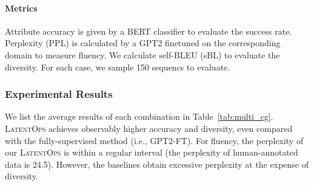 \documentclass[11pt]{article}
\begin{document}
\paragraph{Metrics}
Attribute accuracy is given by a BERT classifier to evaluate the success rate.
Perplexity (PPL) is calculated by a GPT2 finetuned on the corresponding domain to measure fluency. 
We calculate self-BLEU (sBL) to evaluate the diversity.
For each case, we sample 150 sequencs to evaluate. 

\subsubsection{Experimental Results}
\label{sec:generation_composable}
We list the average results of each combination in Table~\ref{tab:multi_cg}. \textsc{LatentOps} achieves observably higher accuracy and diversity, even compared with the fully-supervised method (i.e., GPT2-FT). For fluency, the perplexity of our \textsc{LatentOps} is within a regular interval (the perplexity of human-annotated data is 24.5). However, the baselines obtain excessive perplexity at the expense of diversity.
\end{document}
